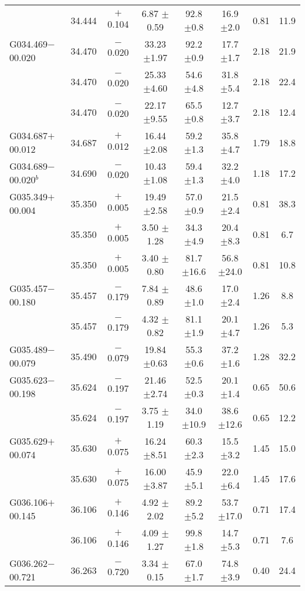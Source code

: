 \begin{ThreePartTable}
\begin{longtable}{lccccccc}
                      &34.444&$+$0.104&6.87	$\pm$0.59&92.8	$\pm$0.8	&16.9	$\pm$2.0	&0.81	&11.9\\
G034.469$-$00.020     &34.470&$-$0.020&33.23	$\pm$1.97&92.2	$\pm$0.9	&17.7	$\pm$1.7	&2.18	&21.9\\
                      &34.470&$-$0.020&25.33	$\pm$4.60&54.6	$\pm$4.8	&31.8	$\pm$5.4	&2.18	&22.4\\
                      &34.470&$-$0.020&22.17	$\pm$9.55&65.5	$\pm$0.8	&12.7	$\pm$3.7	&2.18	&12.4\\
G034.687$+$00.012     &34.687&$+$0.012&16.44	$\pm$2.08&59.2	$\pm$1.3	&35.8	$\pm$4.7	&1.79	&18.8\\
G034.689$-$00.020$^b$ &34.690&$-$0.020&10.43	$\pm$1.08&59.4	$\pm$1.3	&32.2	$\pm$4.0	&1.18	&17.2\\
G035.349$+$00.004     &35.350&$+$0.005&19.49	$\pm$2.58&57.0	$\pm$0.9	&21.5	$\pm$2.4	&0.81	&38.3\\
                      &35.350&$+$0.005&3.50	$\pm$1.28&34.3	$\pm$4.9	&20.4	$\pm$8.3	&0.81	&6.7\\
                      &35.350&$+$0.005&3.40	$\pm$0.80&81.7	$\pm$16.6	&56.8	$\pm$24.0	&0.81	&10.8\\
G035.457$-$00.180     &35.457&$-$0.179&7.84	$\pm$0.89&48.6	$\pm$1.0	&17.0	$\pm$2.4	&1.26	&8.8\\
                      &35.457&$-$0.179&4.32	$\pm$0.82&81.1	$\pm$1.9	&20.1	$\pm$4.7	&1.26	&5.3\\
G035.489$-$00.079     &35.490&$-$0.079&19.84	$\pm$0.63&55.3	$\pm$0.6	&37.2	$\pm$1.6	&1.28	&32.2\\
G035.623$-$00.198     &35.624&$-$0.197&21.46	$\pm$2.74&52.5	$\pm$0.3	&20.1	$\pm$1.4	&0.65	&50.6\\
                      &35.624&$-$0.197&3.75	$\pm$1.19&34.0	$\pm$10.9	&38.6	$\pm$12.6	&0.65	&12.2\\
G035.629$+$00.074     &35.630&$+$0.075&16.24	$\pm$8.51&60.3	$\pm$2.3	&15.5	$\pm$3.2	&1.45	&15.0\\
                      &35.630&$+$0.075&16.00	$\pm$3.87&45.9	$\pm$5.1	&22.0	$\pm$6.4	&1.45	&17.6\\
G036.106$+$00.145     &36.106&$+$0.146&4.92	$\pm$2.02&89.2	$\pm$5.2	&53.7	$\pm$17.0	&0.71	&17.4\\
                      &36.106&$+$0.146&4.09	$\pm$1.27&99.8	$\pm$1.8	&14.7	$\pm$5.3	&0.71	&7.6\\
G036.262$-$00.721     &36.263&$-$0.720&3.34	$\pm$0.15&67.0	$\pm$1.7	&74.8	$\pm$3.9	&0.40	&24.4\\

\end{longtable}
\end{ThreePartTable}
